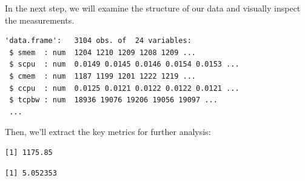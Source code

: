 \begin{Shaded}
\begin{Highlighting}[]
\OtherTok{\textless{}{-}} 
\OtherTok{\textless{}{-}} \NormalTok{(}\NormalTok{,}\NormalTok{))}
\end{Highlighting}
\end{Shaded}

In the next step, we will examine the structure of our data and visually
inspect the measurements.

\begin{Shaded}
\begin{Highlighting}[]
\end{Highlighting}
\end{Shaded}

\begin{verbatim}
'data.frame':   3104 obs. of  24 variables:
 $ smem  : num  1204 1210 1209 1208 1209 ...
 $ scpu  : num  0.0149 0.0145 0.0146 0.0154 0.0153 ...
 $ cmem  : num  1187 1199 1201 1222 1219 ...
 $ ccpu  : num  0.0125 0.0121 0.0122 0.0122 0.0121 ...
 $ tcpbw : num  18936 19076 19206 19056 19097 ...
 ...
\end{verbatim}

Then, we'll extract the key metrics for further analysis:

\begin{Shaded}
\begin{Highlighting}[]
\SpecialCharTok{\$}
\end{Highlighting}
\end{Shaded}

\begin{verbatim}
[1] 1175.85
\end{verbatim}

\begin{Shaded}
\begin{Highlighting}[]
\SpecialCharTok{\$}
\end{Highlighting}
\end{Shaded}

\begin{verbatim}
[1] 5.052353
\end{verbatim}

\begin{Shaded}
\begin{Highlighting}[]
\SpecialCharTok{\$}
\end{Highlighting}
\end{Shaded}

